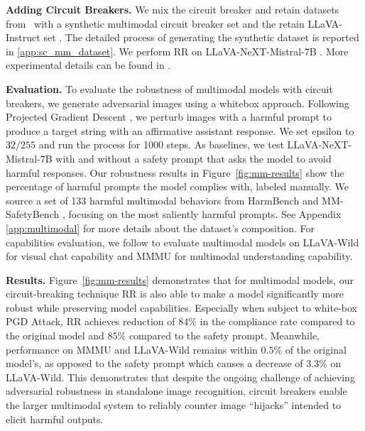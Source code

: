 \textbf{Adding Circuit Breakers.} \quad
We mix the circuit breaker and retain datasets from~ with a synthetic multimodal circuit breaker set and the retain LLaVA-Instruct set \citep{liu2024llavanext}. The detailed process of generating the synthetic dataset is reported in \cref{app:sc_mm_dataset}. We perform RR on LLaVA-NeXT-Mistral-7B \citep{liu2024llavanext}. More experimental details can be found in .

\textbf{Evaluation.} \quad
To evaluate the robustness of multimodal models with circuit breakers, we generate adversarial images using a whitebox approach. Following Projected Gradient Descent \cite{madry2017towards}, we perturb images with a harmful prompt to produce a target string with an affirmative assistant response. We set epsilon to $32/255$ and run the process for 1000 steps. As baselines, we test LLaVA-NeXT-Mistral-7B with and without a safety prompt that asks the model to avoid harmful responses. Our robustness results in Figure~\ref{fig:mm-results} show the percentage of harmful prompts the model complies with, labeled manually. We source a set of 133 harmful multimodal behaviors from HarmBench \citep{mazeika2024harmbench} and MM-SafetyBench \citep{liu2024mmsafetybench}, focusing on the most saliently harmful prompts. See Appendix \ref{app:multimodal} for more details about the dataset's composition. For capabilities evaluation, we follow \cite{liu2024llavanext} to evaluate multimodal models on LLaVA-Wild for visual chat capability and MMMU \citep{yue2023mmmu} for multimodal understanding capability.


\textbf{Results.} \quad
Figure~\ref{fig:mm-results} demonstrates that for multimodal models, our circuit-breaking technique RR is also able to make a model significantly more robust while preserving model capabilities. 
Especially when subject to white-box PGD Attack, RR achieves reduction of $84\%$ in the compliance rate compared to the original model and $85\%$ compared to the safety prompt. Meanwhile, performance on MMMU and LLaVA-Wild remains within $0.5\%$ of the original model's, as opposed to the safety prompt which causes a decrease of $3.3\%$ on LLaVA-Wild. This demonstrates that despite the ongoing challenge of achieving adversarial robustness in standalone image recognition, circuit breakers enable the larger multimodal system to reliably counter image ``hijacks'' \cite{bailey2023image} intended to elicit harmful outputs.



